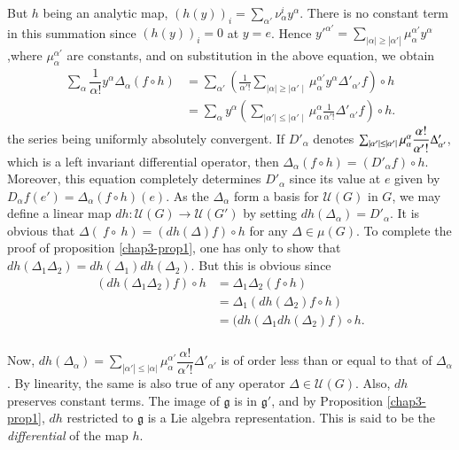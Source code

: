 But $h$ being an analytic map, $(h(y))_i =
\sum_{\alpha'}\nu_\alpha^i y^\alpha$. 
There is no constant term in this summation since $(h(y))_i=0$ at
$y=e$. Hence ${y'}^{\alpha'}=\sum_{| \alpha | \ge | \alpha '
  |} \mu^{\alpha'}_{\alpha}y^\alpha$,\pageoriginale where
$\mu^{\alpha'}_{\alpha}$ are constants, and on substitution in the
above equation, we obtain 
\begin{align*}
\sum_{\alpha}\dfrac{1}{\alpha !}y ^\alpha \Delta_\alpha (f\circ
h) & = \sum_{\alpha'}(\frac{1}{\alpha'!}\sum_{\mid \alpha \mid \ge
  \mid \alpha'\mid} \mu^{\alpha '}_{\alpha}y^\alpha
\Delta'_{\alpha'}f)\circ h\\ 
& = \sum_{\alpha} y^\alpha (\sum_{\mid \alpha' \mid \le
  \mid \alpha'\mid} \mu^{\alpha}_{\alpha}\frac{1}{\alpha' !}
\Delta'_{\alpha '} f)\circ  h. 
\end{align*}
the series being uniformly absolutely convergent. If
$D'_{\alpha}$ denotes $\sum_{| \alpha' | \le |
  \alpha'|}\break \mu^{\alpha}_{\alpha}\dfrac{\alpha !}{\alpha' !}
\Delta'_{\alpha'}$,  which is a left invariant differential operator,
then $\Delta_\alpha(f\circ  h) = (D'_{\alpha}f)\circ h$. Moreover, this
equation completely determines $D'_{\alpha}$ since its value at
$e$ given by $D_{\alpha}f (e')=\Delta_\alpha(f\circ h) (e)$. As the
$\Delta_\alpha$ form a basis for $\mathcal{U}(G)$ in $G$, we may
define a linear map $dh : \mathcal{U}(G) \to \mathcal{U}(G')$ by setting
$dh (\Delta_\alpha)=D'_{\alpha}$. It is obvious that $\Delta(~f \circ 
~h)= (dh(\Delta)f)\circ h$ for any  $\Delta \in \mu (G)$. To complete
the proof of proposition \ref{chap3-prop1}, one has only to show that $dh(\Delta_1
\Delta_2)=dh(\Delta_1)dh(\Delta_2)$. 
But this is obvious since
\begin{align*}
(dh(\Delta_1 \Delta_2)f) \circ  h & = \Delta_1 \Delta_2(f \circ h)\\ 
& = \Delta_1(dh(\Delta_2)f \circ h)\\
& = (dh(\Delta_1 dh (\Delta_2)f)\circ  h.\\
\end{align*}

Now, $dh (\Delta_\alpha) = \sum_{| \alpha' | \leq |
  \alpha |} \mu^{\alpha'}_{\alpha}\dfrac{\alpha !}{\alpha'!}
\Delta'_{\alpha'}$ is of order less than or equal to that of
$\Delta_\alpha$. By linearity, the same is also true of any operator
$\Delta \in \mathcal{U}(G)$. Also, $dh$ preserves constant terms. The
image of $\mathfrak{g}$ is in $\mathfrak{g}'$, and by Proposition
\ref{chap3-prop1}, 
$dh$ restricted to $\mathfrak{g}$ is a Lie algebra representation. This
is said to be the \textit{differential} of the map $h$. 

